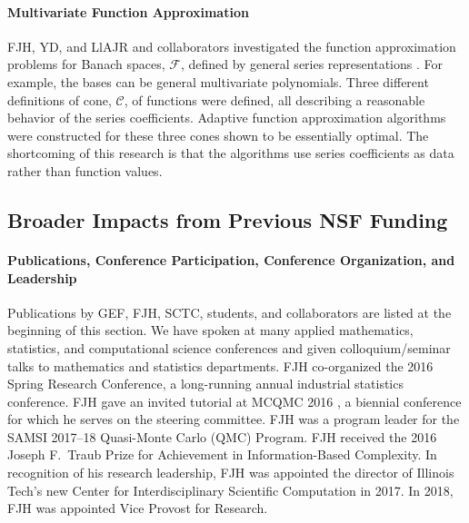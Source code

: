 \documentclass[11pt]{NSFamsart}
\newcommand{\calc}{{\mathcal{C}}}
\newcommand{\calf}{{\mathcal{F}}}
\begin{document}
\paragraph*{Multivariate Function Approximation} \label{sec:PrevFunAppx}

FJH, YD, and LlAJR and collaborators investigated the function approximation problems for Banach spaces, $\calf$, defined by general series representations \cite{DinHic20a,DinEtal20a}.  For example, the bases can be general multivariate polynomials.  Three different definitions of cone, $\calc$, of functions were defined, all describing a reasonable behavior of the series coefficients.  Adaptive function approximation algorithms were constructed for these three cones shown to be essentially optimal.  The shortcoming of this research is that the algorithms use series coefficients as data rather than function values. 


\subsection{Broader Impacts from Previous NSF Funding} \label{prevBIsect}

\paragraph*{Publications, Conference Participation, Conference Organization, and Leadership} Publications by GEF, FJH,  SCTC, students, and collaborators are listed at the beginning of this section.  We have spoken at many applied mathematics, statistics, 
and computational science conferences and given colloquium/seminar talks to mathematics and 
statistics departments.  FJH co-organized the 
2016 Spring Research 
Conference, a long-running annual industrial statistics conference.   FJH gave an invited tutorial
at MCQMC 2016
\cite{Hic17a}, a biennial conference for which he serves on the steering committee.  FJH 
was a program leader for the SAMSI 2017--18 Quasi-Monte Carlo (QMC) Program.   FJH received the 2016 Joseph F.\ Traub Prize for Achievement in Information-Based Complexity. In recognition of his research leadership, FJH was appointed the director of Illinois Tech's new Center for Interdisciplinary 
Scientific Computation in 2017.  In 2018, FJH was appointed Vice Provost for Research.
	
\end{document}
